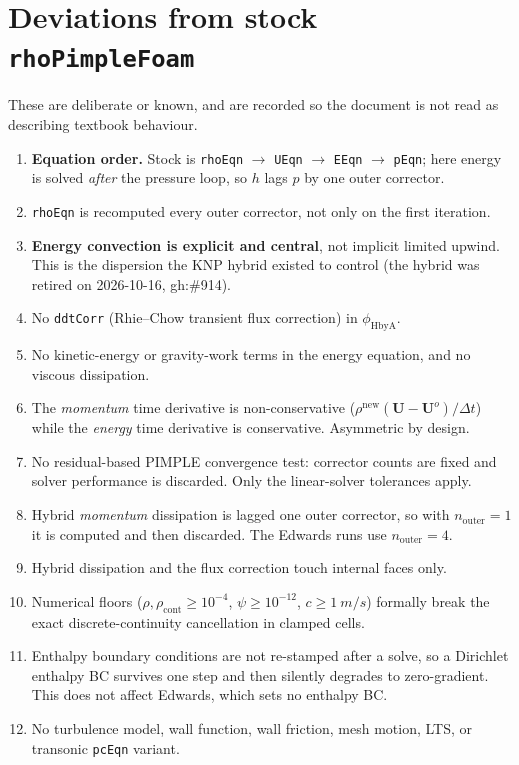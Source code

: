 \documentclass[11pt,a4paper]{article}
\newcommand{\uvec}{\mathbf{U}}
\newcommand{\dt}{\Delta t}
\newcommand{\rhocont}{\rho_{\mathrm{cont}}}
\begin{document}
\section{Deviations from stock \texttt{rhoPimpleFoam}}\label{sec:deviations}

These are deliberate or known, and are recorded so the document is not read as
describing textbook behaviour.

\begin{enumerate}[leftmargin=*]
  \item \textbf{Equation order.} Stock is
        \texttt{rhoEqn} $\to$ \texttt{UEqn} $\to$ \texttt{EEqn} $\to$ \texttt{pEqn};
        here energy is solved \emph{after} the pressure loop, so $h$ lags $p$ by
        one outer corrector.
  \item \texttt{rhoEqn} is recomputed every outer corrector, not only on the
        first iteration.
  \item \textbf{Energy convection is explicit and central}, not implicit limited
        upwind. This is the dispersion the KNP hybrid existed to control
        (the hybrid was retired on 2026-10-16, gh:\#914).
  \item No \texttt{ddtCorr} (Rhie--Chow transient flux correction) in
        $\phi_{\mathrm{HbyA}}$.
  \item No kinetic-energy or gravity-work terms in the energy equation, and no
        viscous dissipation.
  \item The \emph{momentum} time derivative is non-conservative
        ($\rho^{\text{new}}(\uvec-\uvec^{o})/\dt$) while the \emph{energy} time
        derivative is conservative. Asymmetric by design.
  \item No residual-based PIMPLE convergence test: corrector counts are fixed and
        solver performance is discarded. Only the linear-solver tolerances apply.
  \item Hybrid \emph{momentum} dissipation is lagged one outer corrector, so with
        $n_{\text{outer}} = 1$ it is computed and then discarded. The Edwards
        runs use $n_{\text{outer}} = 4$.
  \item Hybrid dissipation and the flux correction touch internal faces only.
  \item Numerical floors ($\rho,\rhocont \ge 10^{-4}$, $\psi \ge 10^{-12}$,
        $c \ge \SI{1}{m/s}$) formally break the exact discrete-continuity
        cancellation in clamped cells.
  \item Enthalpy boundary conditions are not re-stamped after a solve, so a
        Dirichlet enthalpy BC survives one step and then silently degrades to
        zero-gradient. This does not affect Edwards, which sets no enthalpy BC.
  \item No turbulence model, wall function, wall friction, mesh motion, LTS, or
        transonic \texttt{pcEqn} variant.
\end{enumerate}
\end{document}

